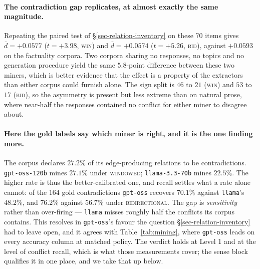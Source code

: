 \paragraph{The contradiction gap replicates, at almost exactly the same magnitude.} Repeating the paired
test of \S\ref{sec-relation-inventory} on these $70$ items gives $\bar{d} = +0.0577$ ($t = +3.98$,
\textsc{win}) and $\bar{d} = +0.0574$ ($t = +5.26$, \textsc{bid}), against $+0.0593$ on the factuality
corpora. Two corpora sharing no responses, no topics and no generation procedure yield the same
$5.8$-point difference between these two miners, which is better evidence that the effect is a property
of the extractors than either corpus could furnish alone. The sign split is $46$ to $21$ (\textsc{win})
and $53$ to $17$ (\textsc{bid}), so the asymmetry is present but less extreme than on natural prose,
where near-half the responses contained no conflict for either miner to disagree about.

\paragraph{Here the gold labels say which miner is right, and it is the one finding more.} The corpus
declares $27.2\%$ of its edge-producing relations to be contradictions. \texttt{gpt-oss-120b} mines
$27.1\%$ under \textsc{windowed}; \texttt{llama-3.3-70b} mines $22.5\%$. The higher rate is thus the
better-calibrated one, and recall settles what a rate alone cannot: of the $164$ gold contradictions
\texttt{gpt-oss} recovers $70.1\%$ against \texttt{llama}'s $48.2\%$, and $76.2\%$ against $56.7\%$
under \textsc{bidirectional}. The gap is \emph{sensitivity} rather than over-firing --- \texttt{llama}
misses roughly half the conflicts its corpus contains. This resolves in \texttt{gpt-oss}'s favour the
question \S\ref{sec-relation-inventory} had to leave open, and it agrees with
Table~\ref{tab:mining}, where \texttt{gpt-oss} leads on every accuracy column at matched policy. The
verdict holds at Level 1 and at the level of conflict recall, which is what those measurements cover; the
sense block qualifies it in one place, and we take that up below.

